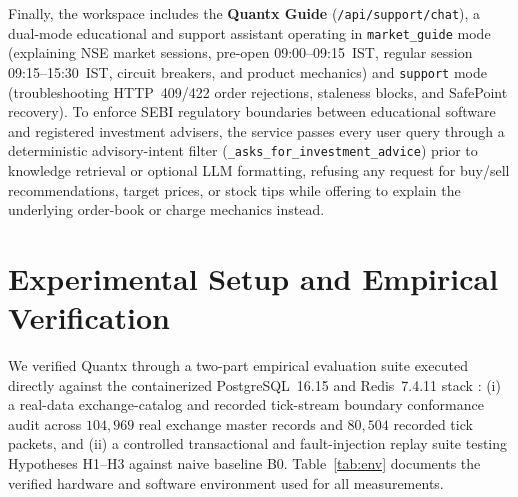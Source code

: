 \documentclass[12pt]{article}
\begin{document}
Finally, the workspace includes the \textbf{Quantx Guide} (\texttt{/api/support/chat}), a dual-mode educational and support assistant operating in \texttt{market\_guide} mode (explaining NSE market sessions, pre-open 09:00--09:15~IST, regular session 09:15--15:30~IST, circuit breakers, and product mechanics) and \texttt{support} mode (troubleshooting HTTP~409/422 order rejections, staleness blocks, and SafePoint recovery). To enforce SEBI regulatory boundaries between educational software and registered investment advisers, the service passes every user query through a deterministic advisory-intent filter (\texttt{\_asks\_for\_investment\_advice}) prior to knowledge retrieval or optional LLM formatting, refusing any request for buy/sell recommendations, target prices, or stock tips while offering to explain the underlying order-book or charge mechanics instead.

\section{Experimental Setup and Empirical Verification}

We verified Quantx through a two-part empirical evaluation suite executed directly against the containerized PostgreSQL~16.15 and Redis~7.4.11 stack \cite{quantx_software,quantx_dataset}: (i) a real-data exchange-catalog and recorded tick-stream boundary conformance audit across $104{,}969$ real exchange master records and $80{,}504$ recorded tick packets, and (ii) a controlled transactional and fault-injection replay suite testing Hypotheses H1--H3 against naive baseline B0. Table~\ref{tab:env} documents the verified hardware and software environment used for all measurements.
\end{document}
